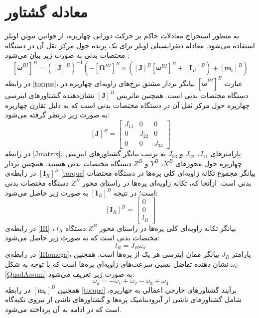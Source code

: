 \section{معادله گشتاور}
به منظور استخراج معادلات حاکم بر حرکت دورانی چهارپره، از قوانین نیوتن اویلر استفاده می‌شود. 
معادله دیفرانسیلی اویلر برای یک پرنده حول مرکز ثقل آن در دستگاه مختصات بدنی به صورت زیر بیان می‌شود \cite{zipfel2000modeling}:
\begin{equation}\label{torque}
	\left[\dot{\boldsymbol{\omega}}^{BI}\right]^B = \left(\left[\boldsymbol J\right]^B\right)^{-1}
	\left(-\left[\boldsymbol \Omega^{BI}\right]^B\times\left(
	\left[\boldsymbol J\right]^B\left[\boldsymbol \omega^{BI}\right]^B+
	\left[\boldsymbol I_R\right]^B
	\right)+ \left[\boldsymbol m_b\right]^B\right)
\end{equation}
در رابطه
\ref{torque}، عبارت 
$\left[\dot{\boldsymbol\omega}^{BI}\right]^B$
بیانگر بردار مشتق نرخ‌های زاویه‌ای چهارپره در دستگاه مختصات بدنی است. همچنین ماتریس 
$\left[\boldsymbol J\right]^B$
نشان‌دهنده گشتاورهای اینرسی چهارپره حول مرکز ثقل آن در دستگاه مختصات بدنی است که به دلیل تقارن چهارپره به صورت زیر درنظر گرفته
 می‌شود:
 \begin{equation}\label{Jmatrix}
 	\left[\boldsymbol J\right]^B = \begin{bmatrix}
 		J_{11} & 0 &0\\
 		0 & J_{22} & 0\\
 		0 & 0 & J_{33}
 	\end{bmatrix}
 \end{equation}
در رابطه 
\ref{Jmatrix}، پارامترهای 
$J_{11}$،
$J_{22}$
و 
$J_{33}$
به ترتیب بیانگر گشتاور‌های اینرسی چهارپره حول محورهای 
$X^B$،
$Y^B$
و 
$Z^B$
دستگاه مختصات بدنی هستند. همچنین بردار 
$\left[\boldsymbol I_R\right]^B$
در رابطه‌ی 
\ref{torque}
بیانگر مجموع تكانه زاویه‌ای کلی پره‌ها در دستگاه مختصات بدنی است. ازآنجا که، تكانه زاویه‌ای پره‌ها در راستای محور
$Z^B$
دستگاه مختصات بدنی است؛ در نتیجه 
$\left[\boldsymbol I_R\right]^B$
به صورت زیر حاصل می‌شود:
\begin{equation}\label{IR}
	\left[\boldsymbol I_R\right]^B = 
	\begin{bmatrix}
		0\\0\\l_R
	\end{bmatrix}
\end{equation}
در رابطه‌ی 
\ref{IR}
، 
$l_R$
بیانگر تكانه زاویه‌ای کلی پره‌ها در راستای محور
$Z^B$
دستگاه مختصات بدنی است که به صورت زیر حاصل می‌شود:
\begin{equation}\label{IRomega}
	l_R = J_R\omega_d
\end{equation}
در رابطه‌ی
\ref{IRomega}، پارامتر
$J_R$
بیانگر ممان اینرسی هر یک از پره‌ها است. همچنین
$\omega_d$
نشان دهنده تفاضل نسبی سرعت‌های زاویه‌ای پره‌ها است که با توجه به شكل
\ref{QuadAssum}
به صورت زیر تعریف می‌شود:
\begin{equation}\label{omega_d}
	\omega_d = -\omega_1 + \omega_2-\omega_3 + \omega_4
\end{equation}
همچنین 
$\left[\boldsymbol m_b\right]^B$
در رابطه 
\ref{torque}
برآیند گشتاورهای خارجی اعمالی به چهارپره، شامل 
گشتاورهای ناشی از آیرودینامیک پره‌ها و گشتاورهای ناشی از نیروی تكیه‌گاه است که در ادامه به آن پرداخته می‌شود.




